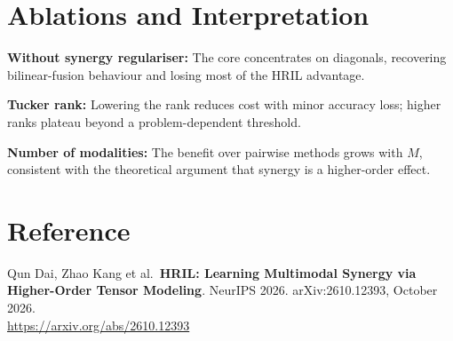 \documentclass[10pt,twocolumn]{article}
\begin{document}
\section{Ablations and Interpretation}

\textbf{Without synergy regulariser:} The core concentrates on diagonals,
recovering bilinear-fusion behaviour and losing most of the HRIL advantage.

\textbf{Tucker rank:} Lowering the rank reduces cost with minor accuracy
loss; higher ranks plateau beyond a problem-dependent threshold.

\textbf{Number of modalities:} The benefit over pairwise methods grows
with $M$, consistent with the theoretical argument that synergy is a
higher-order effect.

\section*{Reference}

Qun Dai, Zhao Kang et al.\
\textbf{HRIL: Learning Multimodal Synergy via Higher-Order Tensor Modeling}.
NeurIPS 2026. arXiv:2610.12393, October 2026.\\
\url{https://arxiv.org/abs/2610.12393}
\end{document}
